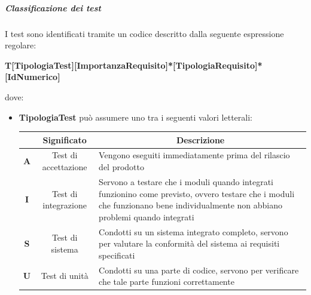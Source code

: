 \subparagraph*{Classificazione dei test}
I test sono identificati tramite un codice descritto dalla seguente espressione regolare:
\begin{center}
    \large{\textbf{T[TipologiaTest][ImportanzaRequisito]*[TipologiaRequisito]*[IdNumerico]}}
\end{center}
dove:
\begin{itemize}[label={}]
    \item \textbf{TipologiaTest} può assumere uno tra i seguenti valori letterali:
          \begin{table}[H]
              \centering
              \renewcommand{\arraystretch}{1.8}
              \begin{tabular}{c|c|p{12cm}}
                  \rowcolor[HTML]{125E28}
                  \multicolumn{1}{c}{\color[HTML]{FFFFFF}\textbf{Sigla}}
                             & \multicolumn{1}{c}{\color[HTML]{FFFFFF}\textbf{Significato}}
                             & \multicolumn{1}{c}{\color[HTML]{FFFFFF}\textbf{Descrizione}}                                                                                                                                                                                   \\
                  \hline
                  \textbf{A} & Test di accettazione                                         & Vengono eseguiti immediatamente prima del rilascio del prodotto                                                                                                                 \\
                  \textbf{I} & Test di integrazione                                         & Servono a testare che i moduli quando integrati funzionino come previsto, ovvero testare che i moduli che funzionano bene individualmente non abbiano problemi quando integrati \\
                  \textbf{S} & Test di sistema                                              & Condotti su un sistema integrato completo, servono per valutare la conformità del sistema ai requisiti specificati                                                              \\
                  \textbf{U} & Test di unità                                                & Condotti su una parte di codice, servono per verificare che tale parte funzioni correttamente                                                                                   \\

\end{tabular}
\end{table}
\end{itemize}
